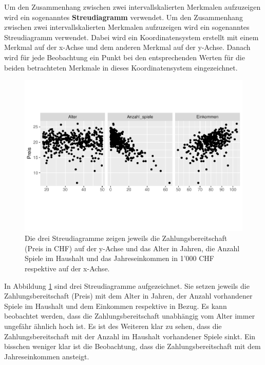 \documentclass[
]{book}
\theoremstyle{definition}
\theoremstyle{definition}
\theoremstyle{definition}
\theoremstyle{definition}
\theoremstyle{remark}
\begin{document}
\label{customdef-streudiagramm}{Um den Zusammenhang zwischen zwei intervallskalierten Merkmalen aufzuzeigen wird ein sogenanntes \textbf{Streudiagramm} verwendet.} Um den Zusammenhang zwischen zwei intervallskalierten Merkmalen aufzuzeigen wird ein sogenanntes Streudiagramm verwendet. Dabei wird ein Koordinatensystem erstellt mit einem Merkmal auf der x-Achse und dem anderen Merkmal auf der y-Achse. Danach wird für jede Beobachtung ein Punkt bei den entsprechenden Werten für die beiden betrachteten Merkmale in dieses Koordinatensystem eingezeichnet.

\begin{figure}

{\centering \includegraphics{aps_statistik1_files/figure-latex/exm-zahlungsbereitschaft-streudiagramm-1} 

}

\caption{Die drei Streudiagramme zeigen jeweils die Zahlungsbereitschaft (Preis in CHF) auf der y-Achse und das Alter in Jahren, die Anzahl Spiele im Haushalt und das Jahreseinkommen in 1'000 CHF respektive auf der x-Achse.}\label{fig:exm-zahlungsbereitschaft-streudiagramm}
\end{figure}

In Abbildung \ref{fig:exm-zahlungsbereitschaft-streudiagramm} sind drei Streudiagramme aufgezeichnet. Sie setzen jeweils die Zahlungsbereitschaft (Preis) mit dem Alter in Jahren, der Anzahl vorhandener Spiele im Haushalt und dem Einkommen respektive in Bezug. Es kann beobachtet werden, dass die Zahlungsbereitschaft unabhängig vom Alter immer ungefähr ähnlich hoch ist. Es ist des Weiteren klar zu sehen, dass die Zahlungsbereitschaft mit der Anzahl im Haushalt vorhandener Spiele sinkt. Ein bisschen weniger klar ist die Beobachtung, dass die Zahlungsbereitschaft mit dem Jahreseinkommen ansteigt.
\end{document}
